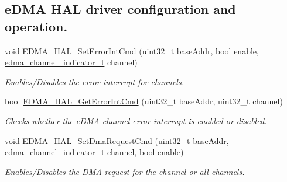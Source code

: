 \subsection*{e\+D\+MA H\+AL driver configuration and operation.}
\begin{DoxyCompactItemize}
\item 
void \hyperlink{group__edma__hal_ga0aebf8f0f919d9bd994699a083e68a6b}{E\+D\+M\+A\+\_\+\+H\+A\+L\+\_\+\+Set\+Error\+Int\+Cmd} (uint32\+\_\+t base\+Addr, bool enable, \hyperlink{group__edma__hal_ga232a0cfe340402eda7039baa8889a161}{edma\+\_\+channel\+\_\+indicator\+\_\+t} channel)
\begin{DoxyCompactList}\small\item\em Enables/\+Disables the error interrupt for channels. \end{DoxyCompactList}\item 
bool \hyperlink{group__edma__hal_ga6aea98f443c947cb3d6a7a36e6ffd655}{E\+D\+M\+A\+\_\+\+H\+A\+L\+\_\+\+Get\+Error\+Int\+Cmd} (uint32\+\_\+t base\+Addr, uint32\+\_\+t channel)
\begin{DoxyCompactList}\small\item\em Checks whether the e\+D\+MA channel error interrupt is enabled or disabled. \end{DoxyCompactList}\item 
void \hyperlink{group__edma__hal_gaac76117f0880966a82524b1be0b8abc7}{E\+D\+M\+A\+\_\+\+H\+A\+L\+\_\+\+Set\+Dma\+Request\+Cmd} (uint32\+\_\+t base\+Addr, \hyperlink{group__edma__hal_ga232a0cfe340402eda7039baa8889a161}{edma\+\_\+channel\+\_\+indicator\+\_\+t} channel, bool enable)
\begin{DoxyCompactList}\small\item\em Enables/\+Disables the D\+MA request for the channel or all channels. \end{DoxyCompactList}\end{DoxyCompactItemize}
